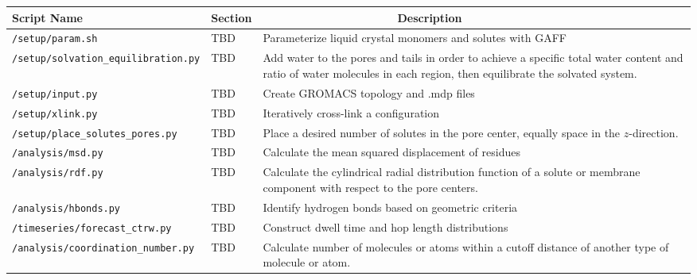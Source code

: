 \documentclass{article}
\begin{document}
  \begin{table}[htb!]
  \centering
  \begin{tabular}{|A|B|C|}
  \hline
  \textbf{Script Name} & \textbf{Section} & ~~~~~~~~~~~~~~~~~~~~~\textbf{Description} \\
  \hline

  \texttt{/setup/param.sh} & TBD & Parameterize liquid crystal monomers and 
  solutes with GAFF \\ \hline

  \texttt{/setup/solvation\_equilibration.py} & TBD & Add water to the pores and tails
  in order to achieve a specific total water content and ratio of water molecules in each
  region, then equilibrate the solvated system. \\ \hline
  
  \texttt{/setup/input.py} & TBD & Create GROMACS topology and .mdp files \\ \hline
  
  \texttt{/setup/xlink.py} & TBD & Iteratively cross-link a configuration \\ \hline
  
  \texttt{/setup/place\_solutes\_pores.py} & TBD & Place a desired number of solutes
  in the pore center, equally space in the $z$-direction. \\ \hline
  
  \texttt{/analysis/msd.py} & TBD & Calculate the mean squared displacement of residues \\ \hline
  
  \texttt{/analysis/rdf.py} & TBD & Calculate the cylindrical radial distribution function of
  a solute or membrane component with respect to the pore centers. \\ \hline
  
  \texttt{/analysis/hbonds.py} & TBD & Identify hydrogen bonds based on geometric criteria \\ \hline
  
  \texttt{/timeseries/forecast\_ctrw.py} & TBD & Construct dwell time and hop length distributions \\ \hline 
  
  \texttt{/analysis/coordination\_number.py} & TBD & Calculate number of molecules or atoms within a
  cutoff distance of another type of molecule or atom. \\ \hline
  

\end{tabular}
\end{table}
\end{document}

